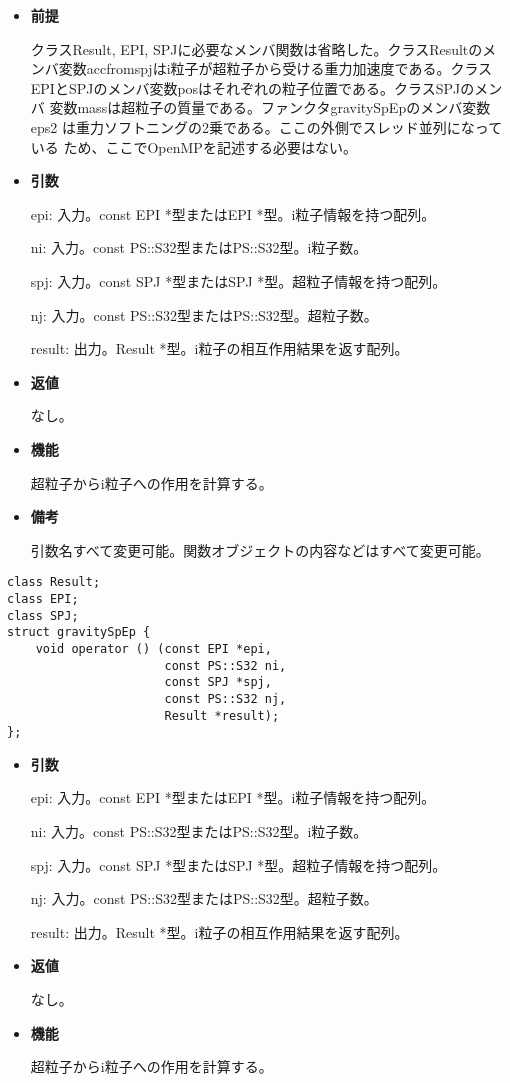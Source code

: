 \begin{itemize}

\item {\bf 前提}

  クラスResult, EPI, SPJに必要なメンバ関数は省略した。クラスResultのメ
  ンバ変数accfromspjはi粒子が超粒子から受ける重力加速度である。クラス
  EPIとSPJのメンバ変数posはそれぞれの粒子位置である。クラスSPJのメンバ
  変数massは超粒子の質量である。ファンクタgravitySpEpのメンバ変数eps2
  は重力ソフトニングの2乗である。ここの外側でスレッド並列になっている
  ため、ここでOpenMPを記述する必要はない。

\item {\bf 引数}

  epi: 入力。const EPI *型またはEPI *型。i粒子情報を持つ配列。

  ni: 入力。const PS::S32型またはPS::S32型。i粒子数。

  spj: 入力。const SPJ *型またはSPJ *型。超粒子情報を持つ配列。
  
  nj: 入力。const PS::S32型またはPS::S32型。超粒子数。

  result: 出力。Result *型。i粒子の相互作用結果を返す配列。

\item {\bf 返値}

  なし。
  
\item {\bf 機能}

  超粒子からi粒子への作用を計算する。
  
\item {\bf 備考}

  引数名すべて変更可能。関数オブジェクトの内容などはすべて変更可能。
  
\end{itemize}
\fi

\begin{lstlisting}[caption=calcForceSpEp]
class Result;
class EPI;
class SPJ;
struct gravitySpEp {
    void operator () (const EPI *epi,
                      const PS::S32 ni,
                      const SPJ *spj,
                      const PS::S32 nj,
                      Result *result);
};
\end{lstlisting}

\begin{itemize}

\item {\bf 引数}

  epi: 入力。const EPI *型またはEPI *型。i粒子情報を持つ配列。

  ni: 入力。const PS::S32型またはPS::S32型。i粒子数。

  spj: 入力。const SPJ *型またはSPJ *型。超粒子情報を持つ配列。
  
  nj: 入力。const PS::S32型またはPS::S32型。超粒子数。

  result: 出力。Result *型。i粒子の相互作用結果を返す配列。

\item {\bf 返値}

  なし。
  
\item {\bf 機能}

  超粒子からi粒子への作用を計算する。
  
\end{itemize}
